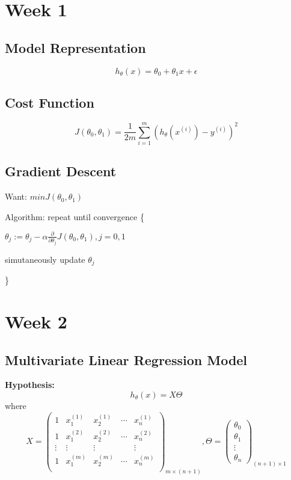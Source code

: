 \documentclass{article}
\begin{document}
\section{Week 1}

\subsection{Model Representation}
	\begin{displaymath}
		h_\theta(x)=\theta_0+\theta_1x+\epsilon
	\end{displaymath}
	
\subsection{Cost Function}
	
	$$J(\theta_0,\theta_1)=\frac{1}{2m}\sum_{i=1}^{m}(h_\theta(x^{(i)})-y^{(i)})^2$$

\subsection{Gradient Descent}
	Want: $min J(\theta_0,\theta_1)$
	
	Algorithm:
	repeat until convergence \{
	
	 $\theta_j := \theta_j - \alpha\frac{\partial}{\partial\theta_j}J(\theta_0,\theta_1),j=0,1$
	 
	 simutaneously update $\theta_j$
	 
	  \}

\section{Week 2}
\subsection{Multivariate Linear Regression Model}
\textbf{Hypothesis:}
$$h_\theta(x)=X\Theta$$
where
\begin{equation*}
X=
\left(\begin{array}{ccccc}
1 & x^{(1)}_1 & x^{(1)}_2 & \cdots & x^{(1)}_n \\
1 & x^{(2)}_1 & x^{(2)}_2 & \cdots & x^{(2)}_n \\
\vdots & \vdots & \vdots &          &\vdots \\
1 & x^{(m)}_1 & x^{(m)}_2 & \cdots & x^{(m)}_n \\
\end{array}
\right)_{m\times{(n+1)}},
\Theta =
\left(\begin{array}{c}
\theta_0\\
\theta_1\\
\vdots\\
\theta_n
\end{array}
\right)_{(n+1)\times 1}
\end{equation*}
\end{document}
